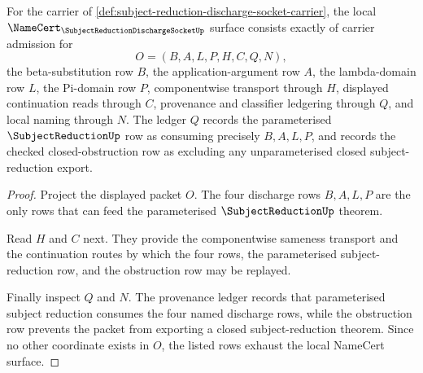 \begin{theorem}
\label{thm:subject-reduction-discharge-socket-namecert-obligations}
For the carrier of \autoref{def:subject-reduction-discharge-socket-carrier}, the local $\NameCert_{\SubjectReductionDischargeSocketUp}$ surface consists exactly of carrier admission for
$$
O=(B,A,L,P,H,C,Q,N),
$$
the beta-substitution row $B$, the application-argument row $A$, the lambda-domain row $L$, the Pi-domain row $P$, componentwise transport through $H$, displayed continuation reads through $C$, provenance and classifier ledgering through $Q$, and local naming through $N$. The ledger $Q$ records the parameterised $\SubjectReductionUp$ row as consuming precisely $B,A,L,P$, and records the checked closed-obstruction row as excluding any unparameterised closed subject-reduction export.
\end{theorem}
\begin{proof}
Project the displayed packet $O$. The four discharge rows $B,A,L,P$ are the only rows that can feed the parameterised $\SubjectReductionUp$ theorem.

Read $H$ and $C$ next. They provide the componentwise sameness transport and the continuation routes by which the four rows, the parameterised subject-reduction row, and the obstruction row may be replayed.

Finally inspect $Q$ and $N$. The provenance ledger records that parameterised subject reduction consumes the four named discharge rows, while the obstruction row prevents the packet from exporting a closed subject-reduction theorem. Since no other coordinate exists in $O$, the listed rows exhaust the local NameCert surface.
\end{proof}

